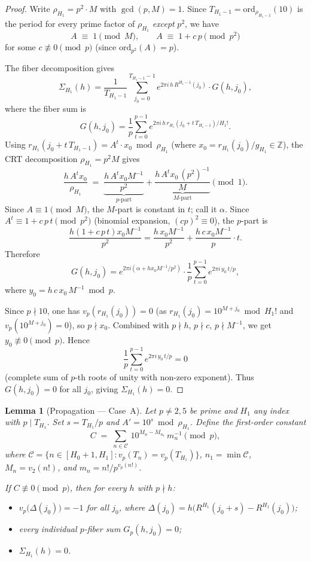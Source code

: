 \documentclass[
]{article}
\newtheorem{lemma}[theorem]{Lemma}
\begin{document}
\begin{proof}
Write $\rho_{H_1}=p^2\cdot M$ with $\gcd(p,M)=1$.
Since $T_{H_1-1}=\mathrm{ord}_{\rho_{H_1-1}}(10)$ is the period for every prime
factor of $\rho_{H_1}$ \emph{except} $p^2$, we have
\[
  A \;\equiv\; 1\pmod{M}, \qquad
  A \;\equiv\; 1+c\,p\pmod{p^2}
\]
for some $c\not\equiv 0\pmod p$ (since $\mathrm{ord}_{p^2}(A)=p$).

The fiber decomposition gives
\[
\Sigma_{H_1}(h) = \frac{1}{T_{H_1-1}}\sum_{j_0=0}^{T_{H_1-1}-1}
  e^{2\pi i\,h\,R^{H_1-1}(j_0)}\cdot G(h,j_0),
\]
where the fiber sum is
\[
G(h,j_0) = \frac{1}{p}\sum_{t=0}^{p-1}
  e^{2\pi i\,h\,r_{H_1}(j_0+t\,T_{H_1-1})/H_1!}.
\]
Using $r_{H_1}(j_0+t\,T_{H_1-1})=A^t\cdot x_0\bmod\rho_{H_1}$
(where $x_0=r_{H_1}(j_0)/g_{H_1}\in\mathbb{Z}$), the CRT decomposition
$\rho_{H_1}=p^2 M$ gives
\[
\frac{h\,A^t x_0}{\rho_{H_1}} \;=\;
  \underbrace{\frac{h\,A^t x_0 M^{-1}}{p^2}}_{\text{$p$-part}}
  +
  \underbrace{\frac{h\,A^t x_0\,(p^2)^{-1}}{M}}_{\text{$M$-part}}\pmod{1}.
\]
Since $A\equiv 1\pmod M$, the $M$-part is constant in $t$; call it $\alpha$.
Since $A^t\equiv 1+c\,p\,t\pmod{p^2}$ (binomial expansion, $(cp)^2\equiv 0$), the $p$-part is
\[
\frac{h(1+c\,p\,t)x_0 M^{-1}}{p^2}
=\frac{h\,x_0 M^{-1}}{p^2}+\frac{h\,c\,x_0 M^{-1}}{p}\cdot t.
\]
Therefore
\[
G(h,j_0) = e^{2\pi i(\alpha+h x_0 M^{-1}/p^2)}
  \cdot \frac{1}{p}\sum_{t=0}^{p-1} e^{2\pi i\,y_0\,t/p},
\]
where $y_0 = h\,c\,x_0\,M^{-1}\bmod p$.

Since $p\nmid 10$, one has $v_p(r_{H_1}(j_0))=0$ (as $r_{H_1}(j_0)=10^{M+j_0}\bmod H_1!$
and $v_p(10^{M+j_0})=0$), so $p\nmid x_0$.
Combined with $p\nmid h$, $p\nmid c$, $p\nmid M^{-1}$, we get $y_0\not\equiv 0\pmod p$.
Hence
\[
\frac{1}{p}\sum_{t=0}^{p-1} e^{2\pi i\,y_0\,t/p} = 0
\]
(complete sum of $p$-th roots of unity with non-zero exponent).
Thus $G(h,j_0)=0$ for all $j_0$, giving $\Sigma_{H_1}(h)=0$.
\end{proof}

\begin{lemma}[Propagation --- Case~A]\label{lem:prime-entry-higher}
Let $p\ne 2,5$ be prime and $H_1$ any index with $p\mid T_{H_1}$.
Set $s=T_{H_1}/p$ and $A'=10^s\bmod\rho_{H_1}$.
Define the \emph{first-order constant}
\[
  C \;=\; \sum_{n\in\mathcal{C}}\,10^{M_n - M_{n_1}}\,m_n^{-1}
  \pmod{p},
\]
where $\mathcal{C}=\{n\in[H_0+1,H_1]:v_p(T_n)=v_p(T_{H_1})\}$,
$n_1=\min\mathcal{C}$, $M_n=v_2(n!)$, and $m_n=n!/p^{v_p(n!)}$.

If $C\not\equiv 0\pmod{p}$, then for every $h$ with $p\nmid h$:
\begin{itemize}
\item $v_p\!\bigl(\Delta(j_0)\bigr)=-1$ for all $j_0$, where
  $\Delta(j_0)=h\bigl(R^{H_1}(j_0+s)-R^{H_1}(j_0)\bigr)$;
\item every individual $p$-fiber sum $G_p(h,j_0)=0$;
\item $\Sigma_{H_1}(h)=0$.
\end{itemize}
\end{lemma}
\end{document}
